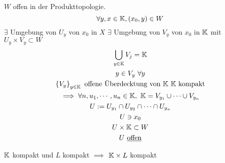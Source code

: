 \begin{Bew}
  $W$ offen in der Produkttopologie.
  \[\forall y,x\in \mathbb{K}, \left( x_0,y \right)\in W\]
  $\exists$ Umgebung von $U_y$ von $x_0$ in $X$
  $\exists$ Umgebung von $V_y$ von $x_0$ in $\mathbb{K}$
  mit $U_y\times V_y\subset W$
  \begin{gather*}
    \bigcup_{y\in\mb{K}}V_j=\mb{K}\\
    y\in V_y\ \forall y\\
    \left\{ V_y \right\}_{y\in \mb{K}}\ \text{offene Überdecktung von $\mb{K}$}\ \text{$\mb{K}$ kompakt}\\
    \implies \forall n,u_1,\cdots,u_n\in\mb{K},\ \mb{K}=V_{y_1}\cup\cdots\cup V_{y_n}\\
    U:=U_{y_1}\cap U_{y_2}\cap\cdots\cap U_{y_n}\\
    U\ni x_0\\
    U\times\mb{K}\subset W\\
    U\ \text{\underline{offen}}
  \end{gather*}
\end{Bew}
\begin{Kor}
  $\mathbb{K}$ kompakt und $L$ kompakt $\implies$ $\mathbb{K}\times L$ kompakt
\end{Kor}
